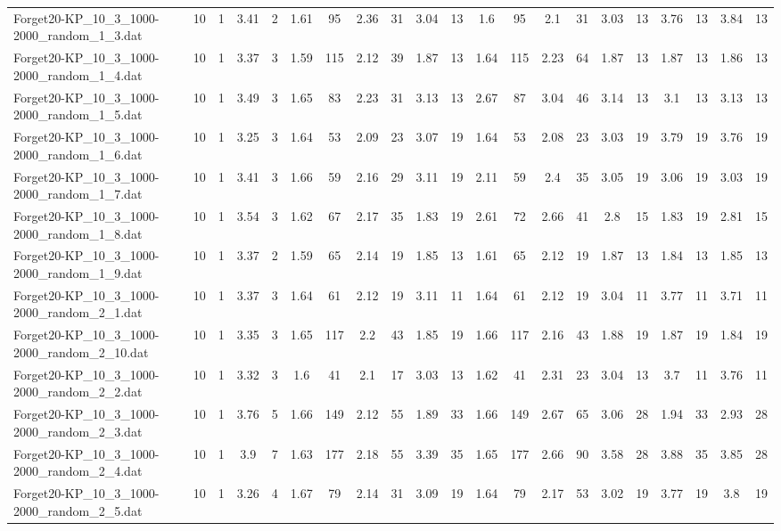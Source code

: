 \begin{sidewaystable}[!ht]
{\begin{tabular}{lcccccccccccccccccccc}
Forget20-KP\_10\_3\_1000-2000\_random\_1\_3.dat & 10 & 1 & 3.41 & 2 & 1.61 & 95 & 2.36 & 31 & 3.04 & 13 & 1.6 & 95 & 2.1 & 31 & 3.03 & 13 & 3.76 & 13 & 3.84 & 13 \\
Forget20-KP\_10\_3\_1000-2000\_random\_1\_4.dat & 10 & 1 & 3.37 & 3 & 1.59 & 115 & 2.12 & 39 & 1.87 & 13 & 1.64 & 115 & 2.23 & 64 & 1.87 & 13 & 1.87 & 13 & 1.86 & 13 \\
Forget20-KP\_10\_3\_1000-2000\_random\_1\_5.dat & 10 & 1 & 3.49 & 3 & 1.65 & 83 & 2.23 & 31 & 3.13 & 13 & 2.67 & 87 & 3.04 & 46 & 3.14 & 13 & 3.1 & 13 & 3.13 & 13 \\
Forget20-KP\_10\_3\_1000-2000\_random\_1\_6.dat & 10 & 1 & 3.25 & 3 & 1.64 & 53 & 2.09 & 23 & 3.07 & 19 & 1.64 & 53 & 2.08 & 23 & 3.03 & 19 & 3.79 & 19 & 3.76 & 19 \\
Forget20-KP\_10\_3\_1000-2000\_random\_1\_7.dat & 10 & 1 & 3.41 & 3 & 1.66 & 59 & 2.16 & 29 & 3.11 & 19 & 2.11 & 59 & 2.4 & 35 & 3.05 & 19 & 3.06 & 19 & 3.03 & 19 \\
Forget20-KP\_10\_3\_1000-2000\_random\_1\_8.dat & 10 & 1 & 3.54 & 3 & 1.62 & 67 & 2.17 & 35 & 1.83 & 19 & 2.61 & 72 & 2.66 & 41 & 2.8 & 15 & 1.83 & 19 & 2.81 & 15 \\
Forget20-KP\_10\_3\_1000-2000\_random\_1\_9.dat & 10 & 1 & 3.37 & 2 & 1.59 & 65 & 2.14 & 19 & 1.85 & 13 & 1.61 & 65 & 2.12 & 19 & 1.87 & 13 & 1.84 & 13 & 1.85 & 13 \\
Forget20-KP\_10\_3\_1000-2000\_random\_2\_1.dat & 10 & 1 & 3.37 & 3 & 1.64 & 61 & 2.12 & 19 & 3.11 & 11 & 1.64 & 61 & 2.12 & 19 & 3.04 & 11 & 3.77 & 11 & 3.71 & 11 \\
Forget20-KP\_10\_3\_1000-2000\_random\_2\_10.dat & 10 & 1 & 3.35 & 3 & 1.65 & 117 & 2.2 & 43 & 1.85 & 19 & 1.66 & 117 & 2.16 & 43 & 1.88 & 19 & 1.87 & 19 & 1.84 & 19 \\
Forget20-KP\_10\_3\_1000-2000\_random\_2\_2.dat & 10 & 1 & 3.32 & 3 & 1.6 & 41 & 2.1 & 17 & 3.03 & 13 & 1.62 & 41 & 2.31 & 23 & 3.04 & 13 & 3.7 & 11 & 3.76 & 11 \\
Forget20-KP\_10\_3\_1000-2000\_random\_2\_3.dat & 10 & 1 & 3.76 & 5 & 1.66 & 149 & 2.12 & 55 & 1.89 & 33 & 1.66 & 149 & 2.67 & 65 & 3.06 & 28 & 1.94 & 33 & 2.93 & 28 \\
Forget20-KP\_10\_3\_1000-2000\_random\_2\_4.dat & 10 & 1 & 3.9 & 7 & 1.63 & 177 & 2.18 & 55 & 3.39 & 35 & 1.65 & 177 & 2.66 & 90 & 3.58 & 28 & 3.88 & 35 & 3.85 & 28 \\
Forget20-KP\_10\_3\_1000-2000\_random\_2\_5.dat & 10 & 1 & 3.26 & 4 & 1.67 & 79 & 2.14 & 31 & 3.09 & 19 & 1.64 & 79 & 2.17 & 53 & 3.02 & 19 & 3.77 & 19 & 3.8 & 19 \\

\end{tabular}}
\end{sidewaystable}
